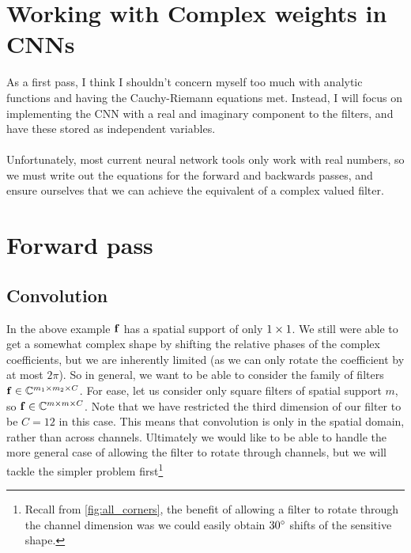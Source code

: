\section{Working with Complex weights in CNNs}
  As a first pass, I think I shouldn't concern myself too much with analytic
  functions and having the Cauchy-Riemann equations met. Instead, I will focus
  on implementing the CNN with a real and imaginary component to the filters,
  and have these stored as independent variables.\\\\
  Unfortunately, most current neural network tools only work with real numbers,
  so we must write out the equations for the forward and backwards passes, and
  ensure ourselves that we can achieve the equivalent of a complex valued
  filter.

\section{Forward pass}
\subsection{Convolution}
\renewcommand{\SigIn}{z}
\renewcommand{\SigOut}{w}
\renewcommand{\Filter}{f}
\renewcommand{\SigInB}{\bmu{\SigIn}}
\renewcommand{\SigOutB}{\bmu{\SigOut}}
\renewcommand{\FilterB}{\bmu{\Filter}}
  
In the above example $\FilterB$ has a spatial support of only $1\times 1$. We still
were able to get a somewhat complex shape by shifting the relative phases of
the complex coefficients, but we are inherently limited (as we can only
rotate the coefficient by at most $2\pi$). So in general, we want to be able
to consider the family of filters $\FilterB \in \complexes[m_1 \x m_2 \x C]$. For
ease, let us consider only square filters of spatial support $m$, so
$\FilterB \in \complexes[m\x m\x C]$. Note that we have restricted the third
dimension of our filter to be $C=12$ in this case. This means that convolution is
only in the spatial domain, rather than across channels. Ultimately we would
like to be able to handle the more general case of allowing the filter to
rotate through channels, but we will tackle the simpler problem 
first\footnote{Recall from \autoref{fig:all_corners}, the benefit of allowing
a filter to rotate through the channel dimension was we could easily obtain
$30^{\circ}$ shifts of the sensitive shape.}

